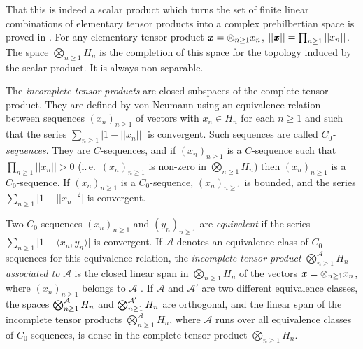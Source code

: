 \documentclass[11pt,english,a4paper]{smfart}
\numberwithin{equation}{section}
\theoremstyle{definition}
\begin{document}
\par\smallskip 
That this is indeed a scalar product which turns the set of finite linear 
combinations of elementary tensor products into a complex prehilbertian 
space is proved in \cite[Lem.~3.21 and Theorem II]{VN}. 
For any elementary tensor product ${\mkern 1.5 mu\pmb{x}}={{\otimes}_{n\ge 1}{x_{n}}}$, 
$||{\mkern 1.5 mu\pmb{x}}||=\prod_{n\ge 1}||{x_{n}}||$. The space ${\bigotimes_{n\ge 1}^{{}}{H_{n}}}$ is 
the completion of this space for the topology induced  by the scalar 
product. It is always non-separable.
\par\smallskip 
The \emph{incomplete tensor products} are closed subspaces of the complete 
tensor product. They are defined by von Neumann using an equivalence 
relation between sequences ${({x_{n}})_{n\ge 1}}$ of vectors with ${x_{n}}\in
{H_{n}} $ for each ${n\ge 1}$ and such that the series 
$\sum_{n\ge 1}\bigl|1-||{x_{n}}||\bigr|$ is convergent. Such sequences are called 
\emph{$C_{0}$-sequences}. They are $C$-sequences, and if 
${({x_{n}})_{n\ge 1}}$ is a $C$-sequence such that $\prod_{n\ge 1}||{x_{n}}||>0$ (i.\,e.\ 
${({x_{n}})_{n\ge 1}}$ is non-zero in ${\bigotimes_{n\ge 1}^{{}}{H_{n}}}$) then 
${({x_{n}})_{n\ge 1}}$ is a $C_{0}$-sequence. If ${({x_{n}})_{n\ge 1}}$ is a $C_{0}$-sequence, ${({x_{n}})_{n\ge 1}}$ is 
bounded, and the series $\sum_{n\ge 1}\bigl|1-||{x_{n}}||^{2}\bigr|$ is 
convergent.
\par\smallskip 
Two $C_{0}$-sequences ${({x_{n}})_{n\ge 1}}$ and ${({y_{n}})_{n\ge 1}}$ are \emph{equivalent} if the 
series $\sum_{n\ge 1}\bigl|1-{\ensuremath{{\langle {x_{n}},{y_{n}}\rangle}}}\bigr|$ is convergent. If 
${\mathcal{A}}$ denotes an equivalence class of $C_{0}$-sequences for this 
equivalence relation, the \emph{incomplete tensor product} 
${\bigotimes_{n\ge 1}^{{\mathcal{A}}}{H_{n}}}$ \emph{associated to} ${\mathcal{A}}$ is the 
closed linear span in ${\bigotimes_{n\ge 1}^{{}}{H_{n}}}$ of the vectors ${\mkern 1.5 mu\pmb{x}}=
{{\otimes}_{n\ge 1}{x_{n}}}$, where ${({x_{n}})_{n\ge 1}}$ belongs to ${\mathcal{A}}$ \cite[Def.~4.1.1]{VN}. 
If ${\mathcal{A}}$ and ${\mathcal{A}}'$ are two different equivalence classes, the spaces 
$\smash[t]{{\bigotimes_{n\ge 1}^{{\mathcal{A}}}{H_{n}}}}$ and $\smash[t]{{\bigotimes_{n\ge 1}^{{{\mathcal{A}}'}}{H_{n}}}}$ are orthogonal, and 
the linear span of the 
incomplete tensor products ${\bigotimes_{n\ge 1}^{{\mathcal{A}}}{H_{n}}}$, where ${\mathcal{A}}$ runs over all 
equivalence classes of $C_{0}$-sequences, is dense in the complete tensor 
product ${\bigotimes_{n\ge 1}^{{}}{H_{n}}}$.
\end{document}
